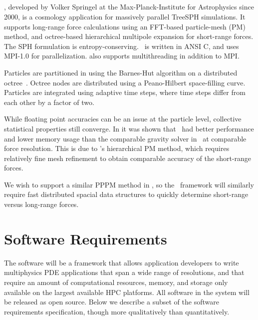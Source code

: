 \documentclass[10pt,twocolumn]{article}
\begin{document}
\subsection{\gadget } \label{ss:gadget}

\gadget, developed by Volker Springel at the Max-Planck-Institute for
Astrophysics since 2000, is a cosmology application for massively
parallel TreeSPH simulations.  It supports long-range force
calculations using an FFT-based particle-mesh (PM) method, and
octree-based hierarchical multipole expansion for short-range forces.
The SPH formulation is entropy-conserving.  \gadget\ is written in
ANSI C, and uses MPI-1.0 for parallelization.   also
supports multithreading in addition to MPI.

Particles are partitioned in  using the Barnes-Hut
algorithm on a distributed octree~\cite{BaHu86}.  Octree nodes are
distributed using a Peano-Hilbert space-filling curve.  Particles are
integrated using adaptive time steps, where time steps differ from
each other by a factor of two.

While floating point accuracies can be an issue at the particle level,
collective statistical properties still converge.  In \cite{OsNa05} it
was shown that \gadget\ had better performance and lower memory usage
than the comparable gravity solver in \enzo\ at comparable force
resolution.  This is due to \enzo's hierarchical PM method, which
requires relatively fine mesh refinement to obtain comparable accuracy
of the short-range forces.

We wish to support a similar PPPM method in \enzoii, so the \cello\
framework will similarly require fast distributed spacial data
structures to quickly determine short-range versus long-range forces.


\section{Software Requirements} \label{s:require}


The software will be a framework that allows application developers to
write multiphysics PDE applications that span a wide range of
resolutions, and that require an amount of computational resources,
memory, and storage only available on the largest available HPC
platforms.  All software in the system will be released as open
source.  Below we describe a subset of the software requirements
specification, though more qualitatively than quantitatively.
\end{document}

